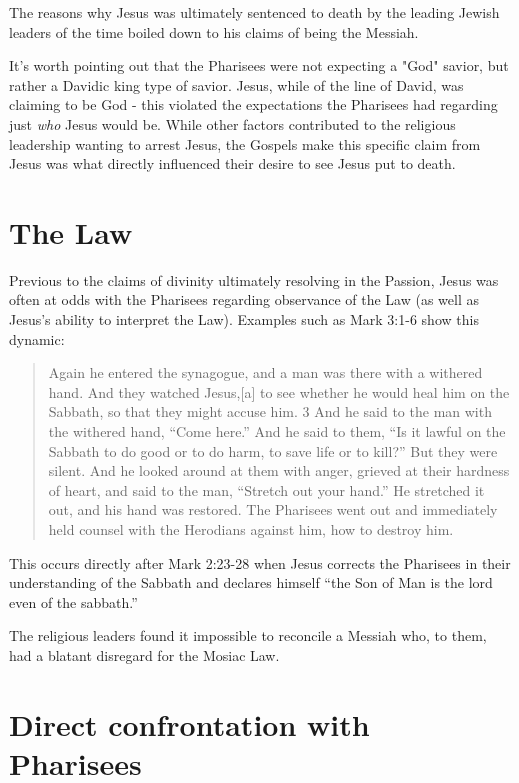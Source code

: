 \documentclass[12pt]{turabian-researchpaper}
\begin{document}
The reasons why Jesus was ultimately sentenced to death by the leading Jewish leaders of the time boiled down to his claims of being the Messiah. 

It's worth pointing out that the Pharisees were not expecting a "God" savior, but rather a Davidic king type of savior. Jesus, while of the line of David, was claiming to be God - this violated the expectations the Pharisees had regarding just \textit{who} Jesus would be. While other factors contributed to the religious leadership wanting to arrest Jesus, the Gospels make this specific claim from Jesus was what directly influenced their desire to see Jesus put to death.

\section{ The Law}

Previous to the claims of divinity ultimately resolving in the Passion, Jesus was often at odds with the Pharisees regarding observance of the Law (as well as Jesus's ability to interpret the Law). Examples such as Mark 3:1-6 show this dynamic:

\begin{quotation}

Again he entered the synagogue, and a man was there with a withered hand.  And they watched Jesus,[a] to see whether he would heal him on the Sabbath, so that they might accuse him. 3 And he said to the man with the withered hand, ``Come here.''  And he said to them, ``Is it lawful on the Sabbath to do good or to do harm, to save life or to kill?” But they were silent.  And he looked around at them with anger, grieved at their hardness of heart, and said to the man, ``Stretch out your hand.” He stretched it out, and his hand was restored.  The Pharisees went out and immediately held counsel with the Herodians against him, how to destroy him.
\end{quotation}

This occurs directly after Mark 2:23-28 when Jesus corrects the Pharisees in their understanding of the Sabbath and declares himself ``the Son of Man is the lord even of the sabbath.'' 

The religious leaders found it impossible to reconcile a Messiah who, to them, had a blatant disregard for the Mosiac Law.

\section{Direct confrontation with Pharisees}
\end{document}
